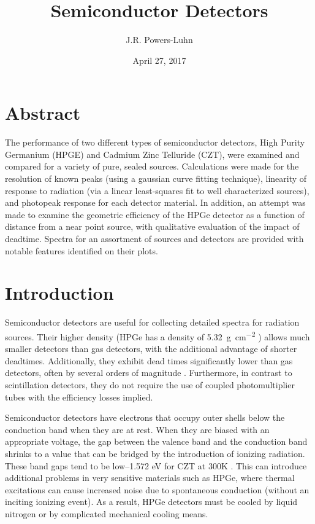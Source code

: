 \documentclass[12pt]{article}
\title{Semiconductor Detectors}
\author{J.R. Powers-Luhn}
\date{April 27, 2017}
\affil{NE550, Thursday 17:30}
\begin{document}

\maketitle

\section{Abstract}
The performance of two different types of semiconductor detectors, High Purity Germanium (HPGE) and Cadmium Zinc Telluride (CZT), were examined and compared for a variety of pure, sealed sources. Calculations were made for the resolution of known peaks (using a gaussian curve fitting technique), linearity of response to radiation (via a linear least-squares fit to well characterized sources), and photopeak response for each detector material. In addition, an attempt was made to examine the geometric efficiency of the HPGe detector as a function of distance from a near point source, with qualitative evaluation of the impact of deadtime. Spectra for an assortment of sources and detectors are provided with notable features identified on their plots.

\section{Introduction}
Semiconductor detectors are useful for collecting detailed spectra for radiation sources. Their higher density (HPGe has a density of \SI{5.32}{\gram\per\centi\meter^2} \cite{giaz}) allows much smaller detectors than gas detectors, with the additional advantage of shorter deadtimes. Additionally, they exhibit dead times significantly lower than gas detectors, often by several orders of magnitude \cite{textbook}. Furthermore, in contrast to scintillation detectors, they do not require the use of coupled photomultiplier tubes with the efficiency losses implied.

Semiconductor detectors have electrons that occupy outer shells below the conduction band when they are at rest. When they are biased with an appropriate voltage, the gap between the valence band and the conduction band shrinks to a value that can be bridged by the introduction of ionizing radiation. These band gaps tend to be low--1.572 eV for CZT at 300K \cite{bandgap}. This can introduce additional problems in very sensitive materials such as HPGe, where thermal excitations can cause increased noise due to spontaneous conduction (without an inciting ionizing event). As a result, HPGe detectors must be cooled by liquid nitrogen or by complicated mechanical cooling means.
\end{document}
